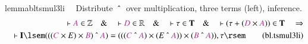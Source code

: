 \begin{restatable}{lemma}{bltsmul3li}~~ Distribute $~\string^~$ over
multiplication, three terms (left), inference.
\begin{align}
\vdash \mc{A} \in \mathbb{Z}\quad\&\quad \vdash \mc{D} \in
    \mathbb{R}\quad\&\quad \vdash \tau \in \mathbf{T}\quad\&\quad \vdash ( \tau
    + ( \mc{D} \times \mc{A} ) ) \in \mathbf{T}\quad\Rightarrow \notag \\ %
     \quad \vdash
    \mathbf{I} \lsem ( ( ( \mc{C} \times E ) \times \mc{B} ) ~\string^~ \mc{A} )
    = ( ( ( \mc{C} ~\string^~ \mc{A} ) \times ( E ~\string^~ \mc{A} ) ) \times (
    \mc{B} ~\string^~ \mc{A} ) ) , \tau
    \rsem\label{eq:bl.tsmul3li}\tag{bl.tsmul3li}
\end{align}
\end{restatable}


